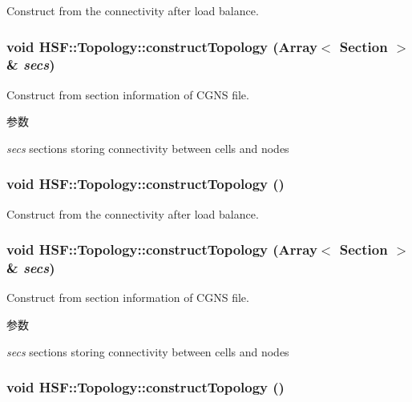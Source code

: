 Construct from the connectivity after load balance. \hypertarget{classHSF_1_1Topology_a95c9a7e1275aa1024ea624c3a2097f27}{
\subsubsection[{constructTopology}]{\setlength{\rightskip}{0pt plus 5cm}void HSF::Topology::constructTopology (Array$<$ {\bf Section} $>$ \& {\em secs})}}
\label{classHSF_1_1Topology_a95c9a7e1275aa1024ea624c3a2097f27}


Construct from section information of CGNS file. 
\begin{DoxyParams}{参数}
\item[{\em secs}]sections storing connectivity between cells and nodes \end{DoxyParams}
\hypertarget{classHSF_1_1Topology_ab2ab89acd7b086d5b95a719f7869b896}{
\subsubsection[{constructTopology}]{\setlength{\rightskip}{0pt plus 5cm}void HSF::Topology::constructTopology ()}}
\label{classHSF_1_1Topology_ab2ab89acd7b086d5b95a719f7869b896}


Construct from the connectivity after load balance. \hypertarget{classHSF_1_1Topology_a95c9a7e1275aa1024ea624c3a2097f27}{
\subsubsection[{constructTopology}]{\setlength{\rightskip}{0pt plus 5cm}void HSF::Topology::constructTopology (Array$<$ {\bf Section} $>$ \& {\em secs})}}
\label{classHSF_1_1Topology_a95c9a7e1275aa1024ea624c3a2097f27}


Construct from section information of CGNS file. 
\begin{DoxyParams}{参数}
\item[{\em secs}]sections storing connectivity between cells and nodes \end{DoxyParams}
\hypertarget{classHSF_1_1Topology_ab2ab89acd7b086d5b95a719f7869b896}{
\subsubsection[{constructTopology}]{\setlength{\rightskip}{0pt plus 5cm}void HSF::Topology::constructTopology ()}}
\label{classHSF_1_1Topology_ab2ab89acd7b086d5b95a719f7869b896}


